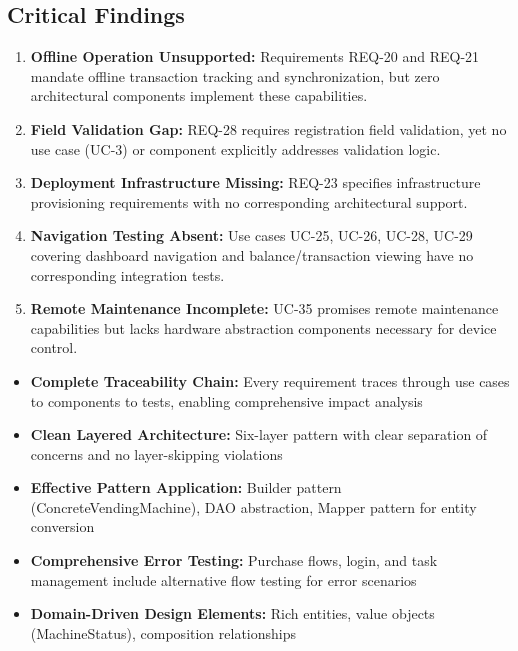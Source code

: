 \documentclass[11pt,a4paper]{article}
\begin{document}
\subsection{Critical Findings}

\begin{tcolorbox}[colback=criticalred!5,colframe=criticalred,title=\textbf{Critical Issues}]
\begin{enumerate}
    \item \textbf{Offline Operation Unsupported:} Requirements REQ-20 and REQ-21 mandate offline transaction tracking and synchronization, but zero architectural components implement these capabilities.

    \item \textbf{Field Validation Gap:} REQ-28 requires registration field validation, yet no use case (UC-3) or component explicitly addresses validation logic.

    \item \textbf{Deployment Infrastructure Missing:} REQ-23 specifies infrastructure provisioning requirements with no corresponding architectural support.

    \item \textbf{Navigation Testing Absent:} Use cases UC-25, UC-26, UC-28, UC-29 covering dashboard navigation and balance/transaction viewing have no corresponding integration tests.

    \item \textbf{Remote Maintenance Incomplete:} UC-35 promises remote maintenance capabilities but lacks hardware abstraction components necessary for device control.
\end{enumerate}
\end{tcolorbox}

\begin{tcolorbox}[colback=strengthgreen!5,colframe=strengthgreen,title=\textbf{Architectural Strengths}]
\begin{itemize}[leftmargin=*]
    \item \textbf{Complete Traceability Chain:} Every requirement traces through use cases to components to tests, enabling comprehensive impact analysis
    \item \textbf{Clean Layered Architecture:} Six-layer pattern with clear separation of concerns and no layer-skipping violations
    \item \textbf{Effective Pattern Application:} Builder pattern (ConcreteVendingMachine), DAO abstraction, Mapper pattern for entity conversion
    \item \textbf{Comprehensive Error Testing:} Purchase flows, login, and task management include alternative flow testing for error scenarios
    \item \textbf{Domain-Driven Design Elements:} Rich entities, value objects (MachineStatus), composition relationships
\end{itemize}
\end{tcolorbox}
\end{document}
